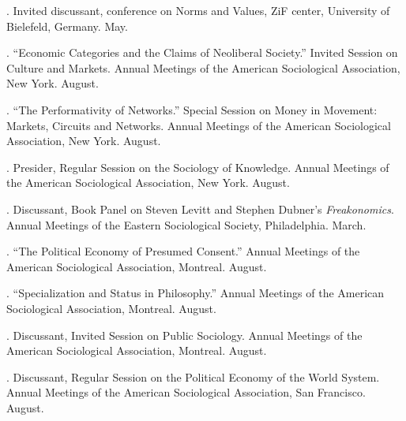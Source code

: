 \documentclass[11pt]{article}
\begin{document}
. Invited discussant, conference on Norms and Values, ZiF center, University of Bielefeld, Germany. May. 

. ``Economic Categories and the Claims of Neoliberal Society.'' Invited Session on Culture and Markets. Annual Meetings of the American Sociological Association, New York. August.

. ``The Performativity of Networks.'' Special Session on Money in Movement: Markets, Circuits and Networks. Annual Meetings of the American Sociological Association, New York. August.

. Presider, Regular Session on the Sociology of Knowledge. Annual Meetings of the American Sociological Association, New York. August.

. Discussant, Book Panel on Steven Levitt and Stephen Dubner's \emph{Freakonomics}. Annual Meetings of the Eastern Sociological Society, Philadelphia. March.

. ``The Political Economy of Presumed Consent.'' Annual Meetings of the American Sociological Association, Montreal. August.

. ``Specialization and Status in Philosophy.'' Annual Meetings of the American Sociological Association, Montreal. August.

. Discussant, Invited Session on Public Sociology. Annual Meetings of the American Sociological Association, Montreal. August.

. Discussant, Regular Session on the Political Economy of the World System. Annual Meetings of the American Sociological Association, San Francisco. August.


\end{document}
